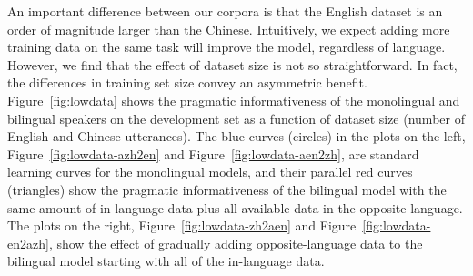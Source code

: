 \documentclass[11pt,a4paper]{article}
\newenvironment{zh}{\begin{CJK}{UTF8}{gbsn}}{\end{CJK}}
\renewcommand{\|}{\mid}
\newcommand{\figref}[1]{Figure~\ref{#1}}
\newcommand{\Figref}[1]{Figure~\ref{#1}}
\begin{document}

An important difference between our corpora is that the English dataset is an order of magnitude larger than the Chinese. Intuitively, we expect adding more training data on the same task will
improve the model, regardless of language. However, we find that the effect of dataset size is not so straightforward. In fact, the differences in training set size convey an asymmetric benefit.
\Figref{fig:lowdata} shows the pragmatic informativeness of the monolingual and bilingual speakers on the development set
as a function of dataset size (number of English and Chinese utterances). The blue curves (circles) in the plots on the left, 
\figref{fig:lowdata-azh2en} and \figref{fig:lowdata-aen2zh}, are standard learning curves for the monolingual 
models, and their parallel red curves (triangles) show the pragmatic informativeness of the bilingual model with the
same amount of in-language data plus all available data in the opposite language. The plots on the right, 
\figref{fig:lowdata-zh2aen} and \figref{fig:lowdata-en2azh}, show the effect of gradually adding 
opposite-language data to the bilingual model starting with all of the in-language data.
\end{document}
